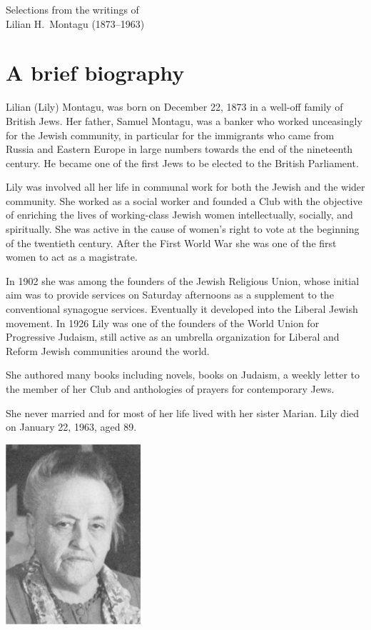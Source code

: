 \documentclass[14pt, article, extrafontsizes, twopage, a4paper]{memoir}
\begin{document}
{
  \centering
  \Large Selections from the writings of\\
  \LARGE Lilian H.\ Montagu (1873–1963)

}

\chapter{A brief biography}

Lilian (Lily) Montagu, was born on December 22, 1873 in a well-off family of British Jews. Her father, Samuel Montagu, was a banker who worked unceasingly for the Jewish community, in particular for the immigrants who came from Russia and Eastern Europe in large numbers towards the end of the nineteenth century. He became one of the first Jews to be elected to the British Parliament.

Lily was involved all her life in communal work for both the Jewish and the wider community. She worked as a social worker and founded a Club with the objective of enriching the lives of working-class Jewish women intellectually, socially, and spiritually. She was active in the cause of women's right to vote at the beginning of the twentieth century. After the First World War she was one of the first women to act as a magistrate.

In 1902 she was among the founders of the Jewish Religious Union, whose initial aim was to provide services on Saturday afternoons as a supplement to the conventional synagogue services. Eventually it developed into the Liberal Jewish movement. In 1926 Lily was one of the founders of the World Union for Progressive Judaism, still active as an umbrella organization for Liberal and Reform Jewish communities around the world.

She authored many books including novels, books on Judaism, a weekly letter to the member of her Club and anthologies of prayers for contemporary Jews.

She never married and for most of her life lived with her sister Marian. Lily died on January 22, 1963, aged 89.

{
  \centering
\includegraphics[width=5cm]{lilyolder.png}\\

}
\end{document}
